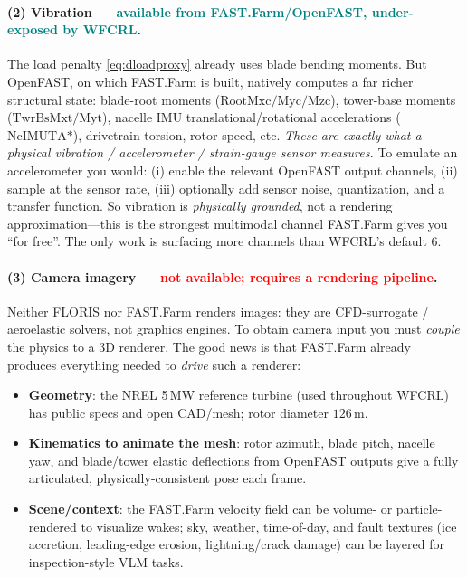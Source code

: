 \documentclass[11pt]{article}
\theoremstyle{plain}
\theoremstyle{definition}
\begin{document}
\paragraph{(2) Vibration --- \textcolor{teal}{available from FAST.Farm/OpenFAST,
under-exposed by WFCRL}.} The load penalty \eqref{eq:dloadproxy} already uses
blade bending moments. But OpenFAST, on which FAST.Farm is built, natively
computes a far richer structural state: blade-root moments
($\text{RootMxc/Myc/Mzc}$), tower-base moments ($\text{TwrBsMxt/Myt}$), nacelle
IMU translational/rotational accelerations ($\text{NcIMUTA*}$), drivetrain
torsion, rotor speed, etc. \emph{These are exactly what a physical vibration /
accelerometer / strain-gauge sensor measures.} To emulate an accelerometer you
would: (i) enable the relevant OpenFAST output channels, (ii) sample at the
sensor rate, (iii) optionally add sensor noise, quantization, and a transfer
function. So vibration is \emph{physically grounded}, not a rendering
approximation---this is the strongest multimodal channel FAST.Farm gives you
``for free''. The only work is surfacing more channels than WFCRL's default 6.

\paragraph{(3) Camera imagery --- \textcolor{red}{not available; requires a
rendering pipeline}.} Neither FLORIS nor FAST.Farm renders images: they are
CFD-surrogate / aeroelastic solvers, not graphics engines. To obtain camera
input you must \emph{couple} the physics to a 3D renderer. The good news is
that FAST.Farm already produces everything needed to \emph{drive} such a
renderer:
\begin{itemize}[leftmargin=1.4em,itemsep=1pt]
  \item \textbf{Geometry}: the NREL 5\,MW reference turbine (used throughout
  WFCRL) has public specs and open CAD/mesh; rotor diameter $126$\,m.
  \item \textbf{Kinematics to animate the mesh}: rotor azimuth, blade pitch,
  nacelle yaw, and blade/tower elastic deflections from OpenFAST outputs give a
  fully articulated, physically-consistent pose each frame.
  \item \textbf{Scene/context}: the FAST.Farm velocity field can be volume- or
  particle-rendered to visualize wakes; sky, weather, time-of-day, and fault
  textures (ice accretion, leading-edge erosion, lightning/crack damage) can be
  layered for inspection-style VLM tasks.
\end{itemize}
\end{document}
